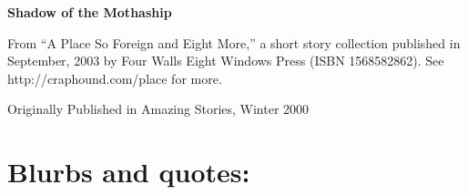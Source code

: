 

\newenvironment{authorof}{\begin{flushright}\sffamily}{\end{flushright}}


\begin{center}
\textbf{\huge\textsf{
Shadow of the Mothaship
}}
\end{center}


\noindent

From ``A Place So Foreign and Eight More,'' a short story
collection published in September, 2003 by Four Walls Eight Windows
Press (ISBN 1568582862). See http://craphound.com/place for more.

Originally Published in Amazing Stories, Winter 2000

\section{Blurbs and quotes:}

